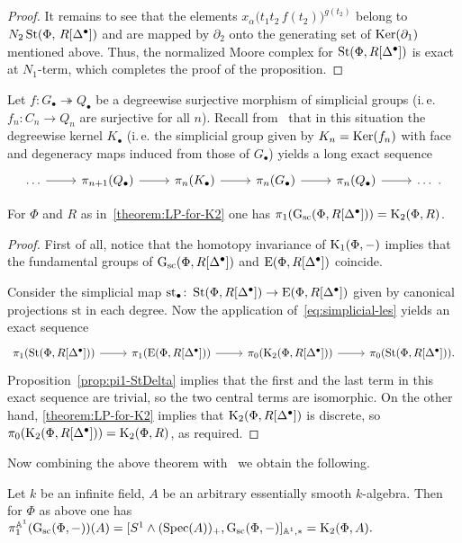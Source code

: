 \documentclass[oneside, 11pt]{amsart} \pdfoutput=1
\begin{document}
\begin{proof}
It remains to see that the elements $x_{\alpha}\big(t_1t_2\,f(t_2)\big)^{g(t_2)}$ belong to $N_2\mathop{\mathrm{St}}\nolimits(\Phi,\,R[\Delta^\bullet])$ and are mapped by $\partial_2$ onto the generating set of $\mathop{\mathrm{Ker}}\nolimits(\partial_1)$ mentioned above. Thus, the normalized Moore complex for $\mathop{\mathrm{St}}\nolimits(\Phi, R[\Delta^\bullet])$ is exact at $N_1$-term, which completes the proof of the proposition. \end{proof}

Let $f\colon G_\bullet\twoheadrightarrow Q_\bullet$ be a degreewise surjective morphism of simplicial groups (i.\,e. $f_n\colon C_n\to Q_n$ are surjective for all $n$). Recall from~\cite[Theorem~1.3]{Ina75} that in this situation the degreewise kernel $K_\bullet$ (i.\,e. the simplicial group given by $K_n = \mathop{\mathrm{Ker}}\nolimits(f_n)$ with face and degeneracy maps induced from those of $G_\bullet$) yields a long exact sequence
\begin{equation} \label{eq:simplicial-les} \begin{tikzcd} \ldots \ar{r} & \pi_{n+1}(Q_\bullet) \ar{r} & \pi_n(K_\bullet) \ar{r} & \pi_n(G_\bullet) \ar{r} & \pi_n(Q_\bullet) \ar{r} & \ldots\ . \end{tikzcd} \end{equation}

\begin{theorem} \label{theorem:pi1-GRDelta}
 For $\Phi$ and $R$ as in~\cref{theorem:LP-for-K2} one has $\pi_1(\mathrm{G}_\mathrm{sc}(\Phi, R[\Delta^\bullet])) = {\mathrm{K}}_2(\Phi, R)$.
\end{theorem}
\begin{proof}
 First of all, notice that the homotopy invariance of ${\mathrm{K}}_1(\Phi, -)$ implies that the fundamental groups of $\mathrm{G}_\mathrm{sc}(\Phi, R[\Delta^\bullet])$ and $\mathrm{E}(\Phi, R[\Delta^\bullet])$ coincide. %
 
 Consider the simplicial map $\mathrm{st}_\bullet \colon \mathop{\mathrm{St}}\nolimits(\Phi, R[\Delta^\bullet]) \to \mathrm{E}(\Phi, R[\Delta^\bullet])$ given by canonical projections $\mathrm{st}$ in each degree. 
 Now the application of~\eqref{eq:simplicial-les} yields an exact sequence \[ \begin{tikzcd} \pi_1(\St(\Phi, R[\Delta^\bullet])) \ar[r] & \pi_1(\E(\Phi, R[\Delta^\bullet])) \ar[r] & \pi_0(\K_2(\Phi, R[\Delta^\bullet])) \ar[r] & \pi_0(\St(\Phi, R[\Delta^\bullet])). \end{tikzcd} \]
 Proposition~\ref{prop:pi1-StDelta} implies that the first and the last term in this exact sequence are trivial, so the two central terms are isomorphic. On the other hand, \cref{theorem:LP-for-K2} implies that ${\mathrm{K}}_2(\Phi, R[\Delta^\bullet])$ is discrete, so $\pi_0({\mathrm{K}}_2(\Phi, R[\Delta^\bullet])) = {\mathrm{K}}_2(\Phi, R)$, as required.
\end{proof}

Now combining the above theorem with~\cite[Theorem~4.3.1]{AHW18} we obtain the following.
\begin{corollary} \label{cor:motivic-pi1} Let $k$ be an infinite field, $A$ be an arbitrary essentially smooth $k$-algebra. Then for $\Phi$ as above one has $\pi_1^{\mathbb{A}^1}(\mathrm{G}_\mathrm{sc}(\Phi, -))(A) = [S^1 \wedge (\mathrm{Spec}(A))_+, \mathrm{G}_\mathrm{sc}(\Phi, -)]_{ \mathbb{A}^1,*} = {\mathrm{K}}_2(\Phi, A).$
\end{corollary}



\printbibliography
\end{document}

